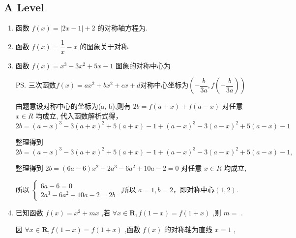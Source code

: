 \subsection*{A Level}
\begin{enumerate}
    \item 函数 $f\left( x\right)  = \left| {{2x} - 1}\right|  + 2$ 的对称轴方程为.
    
    \item 函数 $f\left( x\right)  = \dfrac{1}{x} - x$ 的图象关于对称.
    
    \item 函数 $f\left( x\right)  = {x}^{3} - 3{x}^{2} + {5x} - 1$ 图象的对称中心为
    \begin{jieda}
        \ps 三次函数$f(x) = ax^2+bx^2+cx+d$对称中心坐标为$\left(-\dfrac{b}{3a}, f\left(-\dfrac{b}{3a}\right)\right)$
    
        由题意设对称中心的坐标为(a, b),则有 ${2b} = f\left( {a + x}\right)  + f\left( {a - x}\right)$ 对任意 $x \in  R$ 均成立, 代入函数解析式得，${2b} = {\left( a + x\right) }^{3} - 3{\left( a + x\right) }^{2} + 5\left( {a + x}\right)  - 1 + {\left( a - x\right) }^{3} - 3{\left( a - x\right) }^{2} + 5\left( {a - x}\right)  - 1$
        
        整理得到${2b} = {\left( a + x\right) }^{3} - 3{\left( a + x\right) }^{2} + 5\left( {a + x}\right)  - 1 + {\left( a - x\right) }^{3} - 3{\left( a - x\right) }^{2} + 5\left( {a - x}\right)  - 1,$
        
        整理得到 ${2b} = \left( {{6a} - 6}\right) {x}^{2} + 2{a}^{3} - 6{a}^{2} + {10a} - 2 = 0$ 对任意 $x \in  R$ 均成立,
        
        所以 $\left\{  \begin{array}{l} {6a} - 6 = 0 \\  2{a}^{3} - 6{a}^{2} + {10a} - 2 = {2b} \end{array}\right.$ ,所以 $a = 1,b = 2$，即对称中心$(1,2)$.
    \end{jieda}
    \item 已知函数 $f\left( x\right)  = {x}^{2} + {mx}$ ,若 $\forall x \in  \mathbf{R},f\left( {1 - x}\right)  = f\left( {1 + x}\right)$ ,则 $m =$ .
    \begin{jieda}
        因 $\forall x \in  \mathbf{R},f\left( {1 - x}\right)  = f\left( {1 + x}\right)$ ,函数 $f\left( x\right)$ 的对称轴为直线 $x = 1$ ,


\end{jieda}
\end{enumerate}
